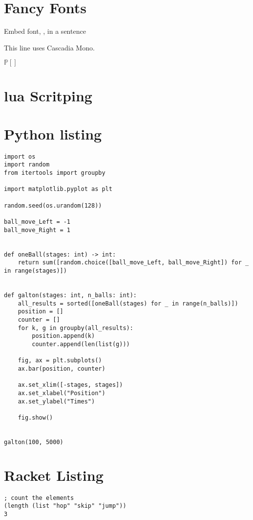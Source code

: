 \documentclass[12pt,a4paper]{article}
\begin{document}
\section{Fancy Fonts}

Embed font, , in a sentence

This line uses { Cascadia Mono.}

$\mathbb{P}[]$

\section{lua Scritping}



\section{Python listing}

\begin{lstlisting}
import os
import random
from itertools import groupby

import matplotlib.pyplot as plt

random.seed(os.urandom(128))

ball_move_Left = -1
ball_move_Right = 1


def oneBall(stages: int) -> int:
    return sum([random.choice([ball_move_Left, ball_move_Right]) for _ in range(stages)])


def galton(stages: int, n_balls: int):
    all_results = sorted([oneBall(stages) for _ in range(n_balls)])
    position = []
    counter = []
    for k, g in groupby(all_results):
        position.append(k)
        counter.append(len(list(g)))

    fig, ax = plt.subplots()
    ax.bar(position, counter)

    ax.set_xlim([-stages, stages])
    ax.set_xlabel("Position")
    ax.set_ylabel("Times")

    fig.show()


galton(100, 5000)
\end{lstlisting}

\section{Racket Listing}
\begin{lstlisting}[language=racket,style=rackeStyle]
; count the elements
(length (list "hop" "skip" "jump"))
3
\end{lstlisting}
\end{document}
